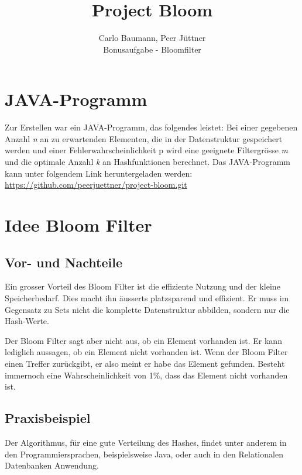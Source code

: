 \documentclass[a4paper, 12pt]{article}
\begin{document}
 
 
 
\title{Project Bloom}
\author{Carlo Baumann, Peer J\"uttner\\
Bonusaufgabe - Bloomfilter}
 
\maketitle

\section{JAVA-Programm} 
Zur Erstellen war ein JAVA-Programm, das folgendes leistet:\newline
Bei einer gegebenen Anzahl \textit{n} an zu erwartenden Elementen, die in der Datenstruktur gespeichert werden und einer Fehlerwahrscheinlichkeit p wird eine geeignete Filtergr\"osse \textit{m} und die optimale Anzahl \textit{k} an Hashfunktionen berechnet.
Das JAVA-Programm kann unter folgendem Link heruntergeladen werden:
\url{https://github.com/peerjuettner/project-bloom.git}
\section{Idee Bloom Filter} 
\subsection{Vor- und Nachteile}
Ein grosser Vorteil des Bloom Filter ist die effiziente Nutzung und der kleine Speicherbedarf. Dies macht ihn \"ausserts platzsparend und effizient. Er muss im Gegensatz zu Sets nicht die komplette Datenstruktur abbilden, sondern nur die Hash-Werte.

Der Bloom Filter sagt aber nicht aus, ob ein Element vorhanden ist. Er kann lediglich aussagen, ob ein Element nicht vorhanden ist. Wenn der Bloom Filter einen Treffer zur\"uckgibt, er also meint er habe das Element gefunden. Besteht immernoch eine Wahrscheinlichkeit von 1\%, dass das Element nicht vorhanden ist.


\subsection{Praxisbeispiel}
Der Algorithmus, f\"ur eine gute Verteilung des Hashes, findet unter anderem in den Programmiersprachen, beispielsweise Java, oder auch in den Relationalen Datenbanken Anwendung.
\end{document}
